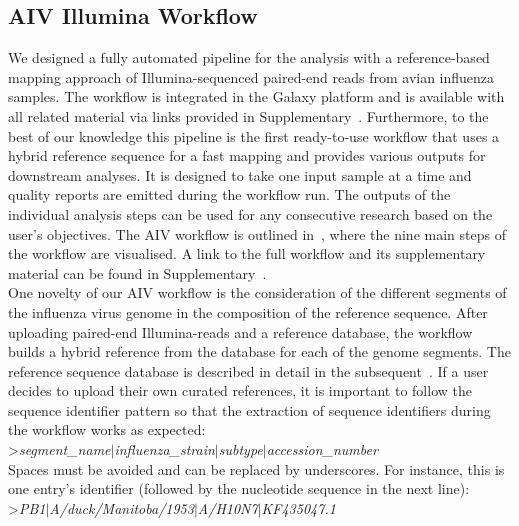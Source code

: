 \subsection{AIV Illumina Workflow}\label{sec:aiv-wf}
We designed a fully automated pipeline for the analysis with a reference-based mapping approach of Illumina-sequenced paired-end reads from avian influenza samples. The workflow is integrated in the Galaxy platform and is available with all related material via links provided in Supplementary~. Furthermore, to the best of our knowledge this pipeline is the first ready-to-use workflow that uses a hybrid reference sequence for a fast mapping and provides various outputs for downstream analyses. It is designed to take one input sample at a time and quality reports are emitted during the workflow run. The outputs of the individual analysis steps can be used for any consecutive research based on the user's objectives. The \ac{AIV} workflow is outlined in~, where the nine main steps of the workflow are visualised. A link to the full workflow and its supplementary material can be found in Supplementary~.\\
One novelty of our \ac{AIV} workflow is the consideration of the different segments of the influenza virus genome in the composition of the reference sequence. After uploading paired-end Illumina-reads and a reference database, the workflow builds a hybrid reference from the database for each of the genome segments. The reference sequence database is described in detail in the subsequent~. If a user decides to upload their own curated references, it is important to follow the sequence identifier pattern so that the extraction of sequence identifiers during the workflow works as expected: \\ >\textit{segment\_name$\mid$influenza\_strain$\mid$subtype$\mid$accession\_number}\\ Spaces must be avoided and can be replaced by underscores. For instance, this is one entry's identifier (followed by the nucleotide sequence in the next line): \\ >\textit{PB1$\mid$A/duck/Manitoba/1953$\mid$A/H10N7$\mid$KF435047.1} 

